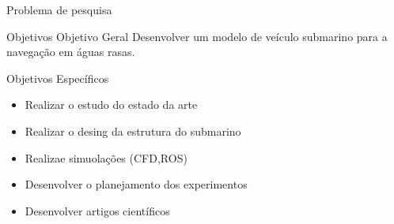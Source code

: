 \begin{frame}[c]{Problema de pesquisa} 
    \transdissolve[duration=0.5]
   
    \begin{center}
    \end{center}
\end{frame}
\begin{frame}[t]{Objetivos}
    Objetivo Geral
    \newline
    Desenvolver um modelo de veículo submarino para a navegação em águas rasas.
    \newline

    Objetivos Específicos
    \begin{itemize}
        \item Realizar o estudo do estado da arte
        \item Realizar o desing da estrutura do submarino
        \item Realizae simuolações (CFD,ROS)
        \item Desenvolver o planejamento dos experimentos
        \item Desenvolver artigos científicos
    \end{itemize}

\end{frame}
